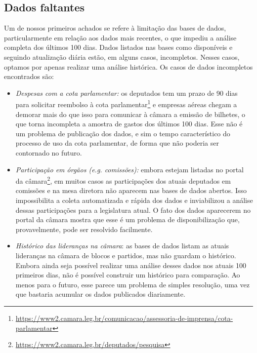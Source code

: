 \documentclass[12pt,a4paper]{article}
\newcommand{\footurl}[1]{{\scriptsize\url{#1}}}
\begin{document}
\subsection{Dados faltantes}
\label{sec:dados-faltantes}

Um de nossos primeiros achados se refere à limitação das bases de dados, particularmente em relação
aos dados mais recentes, o que impediu a análise completa dos últimos 100 dias. Dados listados
nas bases como disponíveis e seguindo atualização diária estão, em alguns casos, incompletos.
Nesses casos, optamos por apenas realizar uma análise histórica. Os casos de dados incompletos
encontrados são:

\begin{itemize}

\item \emph{Despesas com a cota parlamentar:} os deputados tem um prazo de 90 dias para solicitar reembolso
  à cota parlamentar\footnote{\footurl{https://www2.camara.leg.br/comunicacao/assessoria-de-imprensa/cota-parlamentar}}
  e empresas aéreas chegam a demorar mais do que isso para comunicar à câmara a emissão de
  bilhetes, o que torna incompleta a amostra de gastos dos últimos 100 dias. Esse não é um problema de publicação dos
  dados, e sim o tempo característico do processo de uso da cota parlamentar, de forma que não poderia ser contornado
  no futuro.

\item \emph{Participação em órgãos (e.g. comissões):} embora estejam listadas no portal da
  câmara\footnote{\footurl{https://www2.camara.leg.br/deputados/pesquisa}}, em muitos casos as participações
  dos atuais deputados em comissões e na mesa diretora não aparecem nas bases de dados abertos. Isso
  impossibilita a coleta automatizada e rápida dos dados e inviabilizou a análise dessas participações para
  a legislatura atual. O fato dos dados aparecerem no portal da câmara mostra que esse é um problema de
  disponibilização que, provavelmente, pode ser resolvido facilmente.

\item \emph{Histórico das lideranças na câmara}: as bases de dados listam as atuais lideranças na câmara
  de blocos e partidos, mas não guardam o histórico. Embora ainda seja possível realizar uma análise desses 
  dados nos atuais 100 primeiros dias, não é possível construir um histórico para comparação. Ao menos para
  o futuro, esse parece um problema de simples resolução, uma vez que bastaria acumular os dados publicados
  diariamente.
  
\end{itemize}
\end{document}
